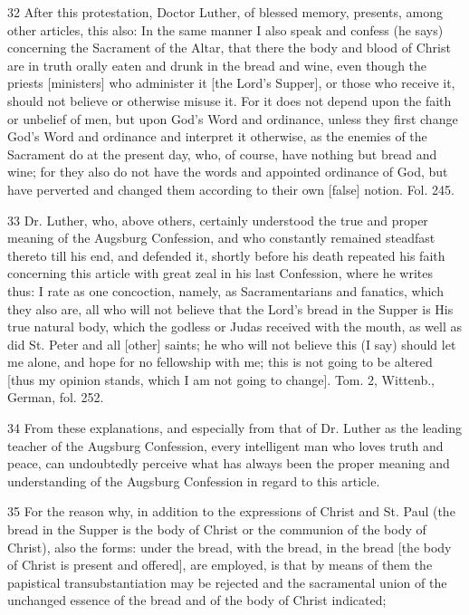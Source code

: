 32 After this protestation, Doctor Luther, of blessed memory, presents, among other articles, this also: In the same manner I also speak and confess (he says) concerning the Sacrament of the Altar, that there the body and blood of Christ are in truth orally eaten and drunk in the bread and wine, even though the priests [ministers] who administer it [the Lord’s Supper], or those who receive it, should not believe or otherwise misuse it. For it does not depend upon the faith or unbelief of men, but upon God’s Word and ordinance, unless they first change God’s Word and ordinance and interpret it otherwise, as the enemies of the Sacrament do at the present day, who, of course, have nothing but bread and wine; for they also do not have the words and appointed ordinance of God, but have perverted and changed them according to their own [false] notion. Fol. 245.

33 Dr. Luther, who, above others, certainly understood the true and proper meaning of the Augsburg Confession, and who constantly remained steadfast thereto till his end, and defended it, shortly before his death repeated his faith concerning this article with great zeal in his last Confession, where he writes thus: I rate as one concoction, namely, as Sacramentarians and fanatics, which they also are, all who will not believe that the Lord’s bread in the Supper is His true natural body, which the godless or Judas received with the mouth, as well as did St. Peter and all [other] saints; he who will not believe this (I say) should let me alone, and hope for no fellowship with me; this is not going to be altered [thus my opinion stands, which I am not going to change]. Tom. 2, Wittenb., German, fol. 252.

34 From these explanations, and especially from that of Dr. Luther as the leading teacher of the Augsburg Confession, every intelligent man who loves truth and peace, can undoubtedly perceive what has always been the proper meaning and understanding of the Augsburg Confession in regard to this article.

35 For the reason why, in addition to the expressions of Christ and St. Paul (the bread in the Supper is the body of Christ or the communion of the body of Christ), also the forms: under the bread, with the bread, in the bread [the body of Christ is present and offered], are employed, is that by means of them the papistical transubstantiation may be rejected and the sacramental union of the unchanged essence of the bread and of the body of Christ indicated;

